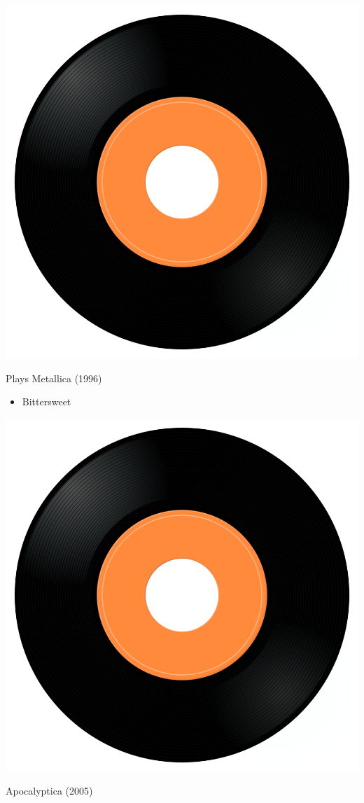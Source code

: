 \begin{minipage}[t]{0.25\textwidth}
\captionsetup{type=figure}
\includegraphics[width=\textwidth]{Images/cover.png}
\caption*{Plays Metallica  (1996)}
\end{minipage}
\begin{minipage}[t]{0.25\textwidth}\vspace{0pt}
\begin{itemize}[nosep,leftmargin=1em,labelwidth=*,align=left]
	\setlength{\itemsep}{0pt}
	\item Bittersweet
\end{itemize}
\end{minipage}
\begin{minipage}[t]{0.25\textwidth}
\captionsetup{type=figure}
\includegraphics[width=\textwidth]{Images/cover.png}
\caption*{Apocalyptica (2005)}
\end{minipage}
